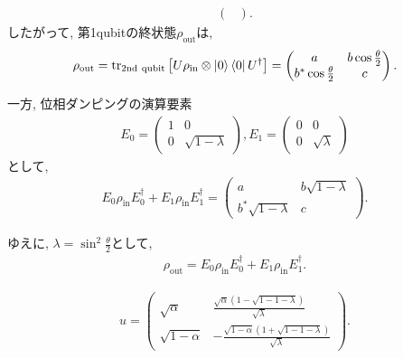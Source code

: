 \begin{ex}
\begin{align*}
\begin{pmatrix}
        \end{pmatrix}.
    \end{align*}
    したがって, 第1qubitの終状態$\rho_\mathrm{out}$は,
    \begin{align*}
        \rho_\mathrm{out}
        =
        \mathrm{tr}_\mathrm{2nd\ qubit} \left[U  \rho_\mathrm{in} \otimes \ket{0}\bra{0} U^\dagger\right]
        =
        \begin{pmatrix}
            a                         & b \cos\frac{\theta}{2} \\
            b^* \cos \frac{\theta}{2} & c
        \end{pmatrix}.
    \end{align*}
    \par
    一方,
    位相ダンピングの演算要素
    \begin{align*}
        E_0 =
        \begin{pmatrix}
            1 & 0                 \\
            0 & \sqrt{1- \lambda}
        \end{pmatrix}
        ,
        E_1 =
        \begin{pmatrix}
            0 & 0              \\
            0 & \sqrt{\lambda}
        \end{pmatrix}
    \end{align*}
    として,
    \begin{align*}
        E_0 \rho_\mathrm{in} E_0^\dagger + E_1 \rho_\mathrm{in} E_1^\dagger =
        \begin{pmatrix}
            a                      & b \sqrt{1 - \lambda} \\
            b^* \sqrt{1 - \lambda} & c
        \end{pmatrix}.
    \end{align*}
    \par
    ゆえに, $\lambda = \sin^2 \frac{\theta}{2}$として,
    \begin{align*}
        \rho_\mathrm{out} = E_0 \rho_\mathrm{in} E_0^\dagger + E_1 \rho_\mathrm{in} E_1^\dagger.
    \end{align*}
\end{ex}


\begin{ex}
    \label{ex8.27}
    \begin{align*}
        u =
        \begin{pmatrix}
            \sqrt{\alpha}     & \frac{\sqrt{\alpha} \left( 1 - \sqrt{1 - 1- \lambda}\right)}{\sqrt{\lambda}}       \\
            \sqrt{1 - \alpha} & - \frac{\sqrt{1 - \alpha} \left( 1 + \sqrt{1 - 1- \lambda}\right)}{\sqrt{\lambda}}
        \end{pmatrix}.
    \end{align*}
\end{ex}

